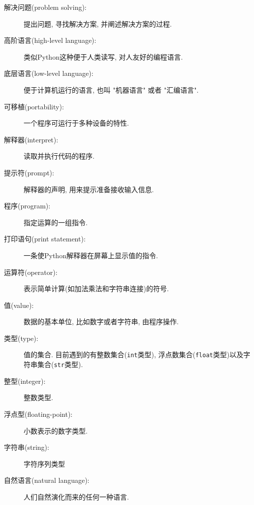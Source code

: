 \documentclass[10pt]{book}
\begin{document}
\begin{description}

\item[解决问题(problem solving):] 提出问题, 寻找解决方案, 并阐述解决方案的过程. 

\item[高阶语言(high-level language):] 类似Python这种便于人类读写, 对人友好的编程语言. 

\item[底层语言(low-level language):] 便于计算机运行的语言, 也叫 "机器语言" 或者 "汇编语言".

\item[可移植(portability):] 一个程序可运行于多种设备的特性. 

\item[解释器(interpret):] 读取并执行代码的程序. 

\item[提示符(prompt):] 解释器的声明, 用来提示准备接收输入信息. 

\item[程序(program):] 指定运算的一组指令. 

\item[打印语句(print statement):] 一条使Python解释器在屏幕上显示值的指令. 

\item[运算符(operator):] 表示简单计算(如加法乘法和字符串连接)的符号. 

\item[值(value):] 数据的基本单位, 比如数字或者字符串, 由程序操作. 

\item[类型(type):] 值的集合. 目前遇到的有整数集合({\tt int}类型), 
浮点数集合({\tt float}类型)以及字符串集合({\tt str}类型).

\item[整型(integer):] 整数类型. 

\item[浮点型(floating-point):] 小数表示的数字类型. 

\item[字符串(string):] 字符序列类型

\item[自然语言(natural language):] 人们自然演化而来的任何一种语言. 


\end{description}
\end{document}
